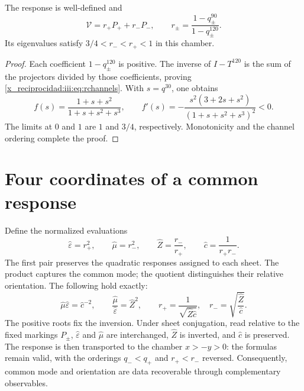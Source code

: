 \begin{proposition}
The response is well-defined and
\begin{equation}
 \mathcal V=r_+P_++r_-P_-,\qquad
 r_\pm=\frac{1-q_\pm^{90}}{1-q_\pm^{120}}.
 \label{x_reciprocidad:iii:eq:rchannels}
\end{equation}
Its eigenvalues satisfy $3/4<r_-<r_+<1$ in this chamber.
\end{proposition}
\begin{proof}
Each coefficient $1-q_\pm^{120}$ is positive. The inverse of $I-T^{120}$
is the sum of the projectors divided by those coefficients, proving
\eqref{x_reciprocidad:iii:eq:rchannels}. With $s=q^{30}$, one obtains
\begin{equation}
 f(s)=\frac{1+s+s^2}{1+s+s^2+s^3},\qquad
 f'(s)=-\frac{s^2(3+2s+s^2)}{(1+s+s^2+s^3)^2}<0.
 \label{x_reciprocidad:iii:eq:monotone}
\end{equation}
The limits at $0$ and $1$ are $1$ and $3/4$, respectively. Monotonicity
and the channel ordering complete the proof.
\end{proof}

\section{Four coordinates of a common response}

Define the normalized evaluations
\begin{equation}
 \widehat\varepsilon=r_+^2,\qquad
 \widehat\mu=r_-^2,\qquad
 \widehat Z=\frac{r_-}{r_+},\qquad
 \widehat c=\frac1{r_+r_-}.
 \label{x_reciprocidad:iii:eq:four}
\end{equation}
The first pair preserves the quadratic responses assigned to each sheet.
The product captures the common mode; the quotient distinguishes their relative orientation.
The following hold exactly:
\begin{equation}
 \widehat\mu\widehat\varepsilon=\widehat c^{-2},\qquad
 \frac{\widehat\mu}{\widehat\varepsilon}=\widehat Z^2,
 \qquad
 r_+=\frac1{\sqrt{\widehat Z\widehat c}},\quad
 r_-=\sqrt{\frac{\widehat Z}{\widehat c}}.
 \label{x_reciprocidad:iii:eq:four-identities}
\end{equation}
The positive roots fix the inversion. Under sheet conjugation,
read relative to the fixed markings $P_\pm$,
$\widehat\varepsilon$ and $\widehat\mu$ are interchanged,
$\widehat Z$ is inverted, and $\widehat c$ is preserved. The response is then transported
to the chamber $x>-y>0$: the formulas remain valid, with the orderings
$q_-<q_+$ and $r_+<r_-$ reversed. Consequently, common mode
and orientation are data recoverable through complementary observables.

